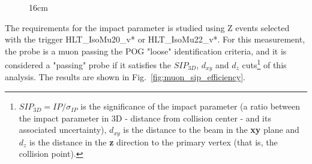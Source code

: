 \begin{figure}[hbtp]{16cm}
	\quad
	\label{fig:muon_reco_id_efficiency}
\end{figure}

The requirements for the impact parameter is studied using Z events selected with the trigger HLT\_IsoMu20\_v* or HLT\_IsoMu22\_v*. For this measurement, the probe is a muon passing the POG "loose" identification criteria, and it is considered a "passing" probe if it satisfies the $SIP_{3D}$, $d_{xy}$ and $d_{z}$ cuts\footnote{$SIP_{3D} = IP/\sigma_{IP}$ is the significance of the impact parameter (a ratio between the impact parameter in 3D - distance from collision center - and its associated uncertainty), $d_{xy}$ is the distance to the beam in the \textbf{xy} plane and $d_{z}$ is the distance in the \textbf{z} direction to the primary vertex (that is, the collision point).} of this analysis. The results are shown in Fig.~\ref{fig:muon_sip_efficiency}.


